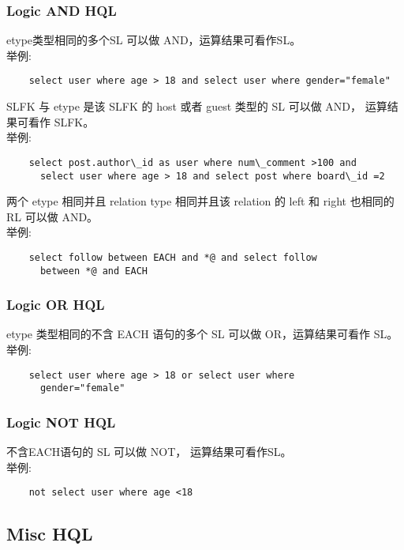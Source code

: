 \documentclass[10pt,a4paper]{article}
\begin{document}
\begin{CJK}{UTF8}{gbsn}
  \subsubsection{Logic AND HQL}
  etype类型相同的多个SL 可以做 AND，运算结果可看作SL。\\

  举例:
\begin{verbatim}
    select user where age > 18 and select user where gender="female"
\end{verbatim}
  SLFK 与 etype 是该 SLFK 的 host 或者 guest 类型的 SL 可以做 AND， 运算结果可看作 SLFK。\\

  举例:
\begin{verbatim}
    select post.author\_id as user where num\_comment >100 and
      select user where age > 18 and select post where board\_id =2
\end{verbatim}
  两个 etype 相同并且 relation type 相同并且该 relation 的 left 和 right 也相同的 RL 可以做 AND。\\

  举例:
\begin{verbatim}
    select follow between EACH and *@ and select follow
      between *@ and EACH
\end{verbatim}

  \subsubsection{Logic OR HQL}
  etype 类型相同的不含 EACH 语句的多个 SL 可以做 OR，运算结果可看作 SL。\\

  举例:
\begin{verbatim}
    select user where age > 18 or select user where
      gender="female"
\end{verbatim}

  \subsubsection{Logic NOT HQL}
  不含EACH语句的 SL 可以做 NOT， 运算结果可看作SL。\\

  举例:
\begin{verbatim}
    not select user where age <18
\end{verbatim}

  \subsection{Misc HQL}


\end{CJK}
\end{document}
